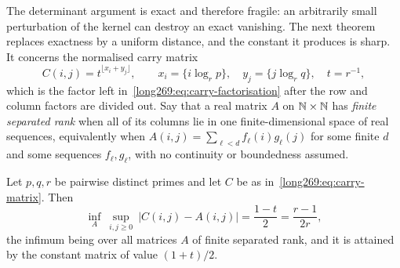 \documentclass[11pt]{article}
\begin{document}
The determinant argument is exact and therefore fragile: an arbitrarily small
perturbation of the kernel can destroy an exact vanishing.  The next theorem
replaces exactness by a uniform distance, and the constant it produces is
sharp.  It concerns the normalised carry matrix
\begin{equation}\label{long269:eq:carry-matrix}
 C(i,j)=t^{\lfloor x_i+y_j\rfloor},
 \qquad
 x_i=\{i\log_r p\},\quad y_j=\{j\log_r q\},\quad t=r^{-1},
\end{equation}
which is the factor left in~\eqref{long269:eq:carry-factorisation} after the row and
column factors are divided out.  Say that a real matrix $A$ on $\mathbb{N}\times\mathbb{N}$ has
\emph{finite separated rank} when all of its columns lie in one
finite-dimensional space of real sequences, equivalently when
$A(i,j)=\sum_{\ell<d}f_\ell(i)g_\ell(j)$ for some finite $d$ and some
sequences $f_\ell,g_\ell$, with no continuity or boundedness assumed.

\begin{theorem}\label{long269:res:uniform-rank}
Let $p,q,r$ be pairwise distinct primes and let $C$ be as
in~\eqref{long269:eq:carry-matrix}.  Then
\[
 \inf_{A}\ \sup_{i,j\ge0}\ |C(i,j)-A(i,j)|=\frac{1-t}{2}=\frac{r-1}{2r},
\]
the infimum being over all matrices $A$ of finite separated rank, and it is
attained by the constant matrix of value $(1+t)/2$.
\end{theorem}
\end{document}
